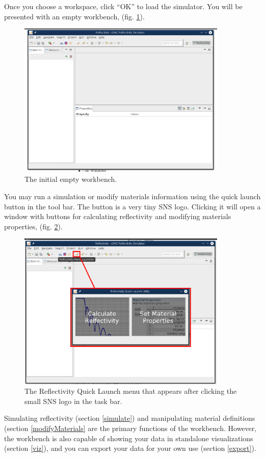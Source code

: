 \documentclass{article}
\begin{document}
Once you choose a workspace, click ``OK'' to load the simulator. You will be
presented with an empty workbench, (fig. \ref{workbench}).

\begin{figure}[!h]
\centering
\includegraphics[width=10cm]{images/workbench.png}
\caption{The initial empty workbench.}
\label{workbench}
\end{figure}

You may run a simulation or modify materials information using the quick launch
button in the tool bar. The button is a very tiny SNS logo. Clicking it
will open a window with buttons for calculating reflectivity and modifying
materials properties, (fig. \ref{launcher}).

\begin{figure}[!h]
\centering
\includegraphics[width=10cm]{images/menuLauncher.png}
\caption{The Reflectivity Quick Launch menu that appears after clicking the
small SNS logo in the task bar.}
\label{launcher}
\end{figure}

Simulating reflectivity (section \ref{simulate}) and manipulating material
definitions (section \ref{modifyMaterials} are the primary functions of the
workbench. However, the workbench is also capable of showing your data in
standalone visualizations (section \ref{viz}), and you can export your data for
your own use (section \ref{export}).
\end{document}
